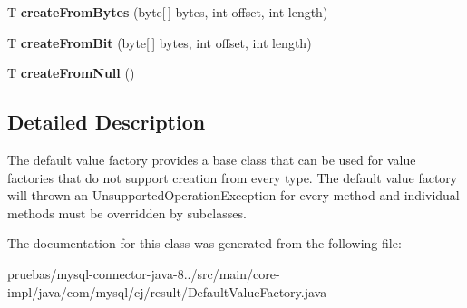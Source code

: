 \begin{DoxyCompactItemize}
\mbox{\label{classcom_1_1mysql_1_1cj_1_1result_1_1_default_value_factory_a97d2423b59241620b2e0a519c54b592a}} 
T {\bfseries create\+From\+Bytes} (byte\mbox{[}$\,$\mbox{]} bytes, int offset, int length)
\item 
\mbox{\label{classcom_1_1mysql_1_1cj_1_1result_1_1_default_value_factory_a05b8ff2d9d1c7ff5c6f5b26188a5476c}} 
T {\bfseries create\+From\+Bit} (byte\mbox{[}$\,$\mbox{]} bytes, int offset, int length)
\item 
\mbox{\label{classcom_1_1mysql_1_1cj_1_1result_1_1_default_value_factory_ad19879592d2d343604ceff8f7d6dde84}} 
T {\bfseries create\+From\+Null} ()
\end{DoxyCompactItemize}


\subsection{Detailed Description}
The default value factory provides a base class that can be used for value factories that do not support creation from every type. The default value factory will thrown an Unsupported\+Operation\+Exception for every method and individual methods must be overridden by subclasses. 

The documentation for this class was generated from the following file\+:\begin{DoxyCompactItemize}
\item 
pruebas/mysql-\/connector-\/java-\/8../src/main/core-\/impl/java/com/mysql/cj/result/Default\+Value\+Factory.\+java\end{DoxyCompactItemize}
